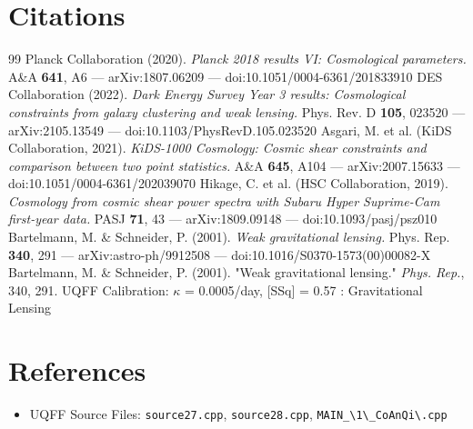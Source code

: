 \documentclass[12pt,a4paper]{article}
\begin{document}
\section*{Citations}
\begin{thebibliography}{99}
 Planck Collaboration (2020). \emph{Planck 2018 results VI: Cosmological parameters.} A\&A \textbf{641}, A6 --- arXiv:1807.06209 --- doi:10.1051/0004-6361/201833910
 DES Collaboration (2022). \emph{Dark Energy Survey Year 3 results: Cosmological constraints from galaxy clustering and weak lensing.} Phys. Rev. D \textbf{105}, 023520 --- arXiv:2105.13549 --- doi:10.1103/PhysRevD.105.023520
 Asgari, M. et al. (KiDS Collaboration, 2021). \emph{KiDS-1000 Cosmology: Cosmic shear constraints and comparison between two point statistics.} A\&A \textbf{645}, A104 --- arXiv:2007.15633 --- doi:10.1051/0004-6361/202039070
 Hikage, C. et al. (HSC Collaboration, 2019). \emph{Cosmology from cosmic shear power spectra with Subaru Hyper Suprime-Cam first-year data.} PASJ \textbf{71}, 43 --- arXiv:1809.09148 --- doi:10.1093/pasj/psz010
 Bartelmann, M. \& Schneider, P. (2001). \emph{Weak gravitational lensing.} Phys. Rep. \textbf{340}, 291 --- arXiv:astro-ph/9912508 --- doi:10.1016/S0370-1573(00)00082-X
 Bartelmann, M. \& Schneider, P. (2001). "Weak gravitational lensing." \emph{Phys. Rep.}, 340, 291.
 UQFF Calibration: $\kappa$ = 0.0005/day, [SSq] = 0.57 : Gravitational Lensing
\end{thebibliography}

\section*{References}
\begin{itemize}
  \item[6.] UQFF Source Files: \texttt{source27.cpp}, \texttt{source28.cpp}, \texttt{MAIN\_\textbackslash {1\textbackslash \_CoAnQi\textbackslash }.cpp}
\end{itemize}

\end{document}
